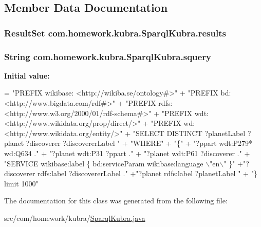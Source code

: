 \subsection{Member Data Documentation}
\subsubsection[{\texorpdfstring{results}{results}}]{\setlength{\rightskip}{0pt plus 5cm}Result\+Set com.\+homework.\+kubra.\+Sparql\+Kubra.\+results\hspace{0.3cm}{\ttfamily [private]}}\hypertarget{classcom_1_1homework_1_1kubra_1_1_sparql_kubra_a629f92dd7ffcb848a72e463438940a43}{}\label{classcom_1_1homework_1_1kubra_1_1_sparql_kubra_a629f92dd7ffcb848a72e463438940a43}
\subsubsection[{\texorpdfstring{squery}{squery}}]{\setlength{\rightskip}{0pt plus 5cm}String com.\+homework.\+kubra.\+Sparql\+Kubra.\+squery\hspace{0.3cm}{\ttfamily [private]}}\hypertarget{classcom_1_1homework_1_1kubra_1_1_sparql_kubra_a6e0744704f50f57b03d954cbb018cd27}{}\label{classcom_1_1homework_1_1kubra_1_1_sparql_kubra_a6e0744704f50f57b03d954cbb018cd27}
{\bfseries Initial value\+:}
\begin{DoxyCode}
= \textcolor{stringliteral}{"PREFIX wikibase: <http://wikiba.se/ontology#>"}
            + \textcolor{stringliteral}{"PREFIX bd: <http://www.bigdata.com/rdf#>"}
            + \textcolor{stringliteral}{"PREFIX rdfs: <http://www.w3.org/2000/01/rdf-schema#>"}
            + \textcolor{stringliteral}{"PREFIX wdt: <http://www.wikidata.org/prop/direct/>"}
            + \textcolor{stringliteral}{"PREFIX wd: <http://www.wikidata.org/entity/>"}
            + \textcolor{stringliteral}{"SELECT DISTINCT ?planetLabel ?planet ?discoverer ?discovererLabel  "}
            + \textcolor{stringliteral}{"WHERE"}
            + \textcolor{stringliteral}{"\{"}
            + \textcolor{stringliteral}{"?ppart wdt:P279* wd:Q634 ."}
            + \textcolor{stringliteral}{"?planet wdt:P31 ?ppart ."}
            + \textcolor{stringliteral}{"?planet wdt:P61 ?discoverer ."}
            + \textcolor{stringliteral}{"SERVICE wikibase:label \{ bd:serviceParam wikibase:language \(\backslash\)"en\(\backslash\)" \}"}
            +\textcolor{stringliteral}{"?discoverer rdfs:label ?discovererLabel ."}
            +\textcolor{stringliteral}{"?planet rdfs:label ?planetLabel  "}
            + \textcolor{stringliteral}{"\} limit 1000"}
\end{DoxyCode}


The documentation for this class was generated from the following file\+:\begin{DoxyCompactItemize}
\item 
src/com/homework/kubra/\hyperlink{_sparql_kubra_8java}{Sparql\+Kubra.\+java}\end{DoxyCompactItemize}
